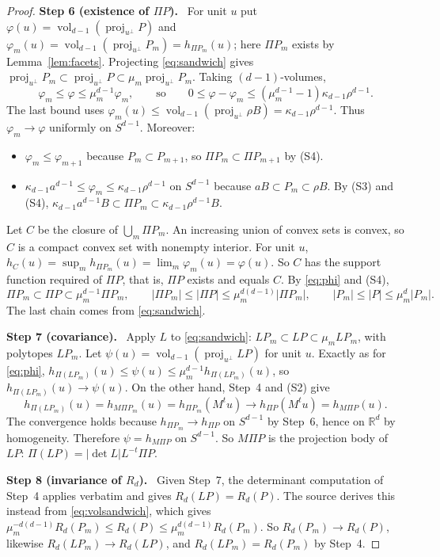 \documentclass[11pt]{article}
\newcommand{\R}{\mathbb R}
\DeclareMathOperator{\vol}{vol}
\DeclareMathOperator{\proj}{proj}
\newcommand{\step}[1]{\par\smallskip\noindent\textbf{#1}\ }
\begin{document}
\begin{proof}
\step{Step 6 (existence of \(\Pi P\)).} For unit \(u\) put
\(\varphi(u)=\vol_{d-1}(\proj_{u^\perp}P)\) and
\(\varphi_m(u)=\vol_{d-1}(\proj_{u^\perp}P_m)=h_{\Pi P_m}(u)\); here
\(\Pi P_m\) exists by Lemma~\ref{lem:facets}. Projecting
\eqref{eq:sandwich} gives
\(\proj_{u^\perp}P_m\subset\proj_{u^\perp}P\subset
\mu_m\proj_{u^\perp}P_m\). Taking \((d-1)\)-volumes,
\begin{equation}\label{eq:phi}
 \varphi_m\le\varphi\le\mu_m^{d-1}\varphi_m,
 \qquad\text{so}\qquad
 0\le\varphi-\varphi_m
 \le(\mu_m^{d-1}-1)\kappa_{d-1}\rho^{d-1}.
\end{equation}
The last bound uses
\(\varphi_m(u)\le\vol_{d-1}(\proj_{u^\perp}\rho B)=\kappa_{d-1}\rho^{d-1}\).
Thus \(\varphi_m\to\varphi\) uniformly on \(S^{d-1}\). Moreover:
\begin{itemize}[leftmargin=2em,itemsep=2pt]
\item \(\varphi_m\le\varphi_{m+1}\) because \(P_m\subset P_{m+1}\), so
 \(\Pi P_m\subset\Pi P_{m+1}\) by (S4).
\item \(\kappa_{d-1}a^{d-1}\le\varphi_m\le\kappa_{d-1}\rho^{d-1}\) on
 \(S^{d-1}\) because \(aB\subset P_m\subset\rho B\). By (S3) and (S4),
 \(\kappa_{d-1}a^{d-1}B\subset\Pi P_m\subset\kappa_{d-1}\rho^{d-1}B\).
\end{itemize}
Let \(C\) be the closure of \(\bigcup_m\Pi P_m\). An increasing union of
convex sets is convex, so \(C\) is a compact convex set with nonempty
interior. For unit \(u\),
\(h_C(u)=\sup_mh_{\Pi P_m}(u)=\lim_m\varphi_m(u)=\varphi(u)\). So \(C\)
has the support function required of \(\Pi P\), that is, \(\Pi P\) exists
and equals \(C\). By \eqref{eq:phi} and (S4),
\begin{equation}\label{eq:volsandwich}
 \Pi P_m\subset\Pi P\subset\mu_m^{d-1}\Pi P_m,
 \qquad
 |\Pi P_m|\le|\Pi P|\le\mu_m^{d(d-1)}|\Pi P_m|,
 \qquad
 |P_m|\le|P|\le\mu_m^d|P_m|.
\end{equation}
The last chain comes from \eqref{eq:sandwich}.

\step{Step 7 (covariance).} Apply \(L\) to \eqref{eq:sandwich}:
\(LP_m\subset LP\subset\mu_mLP_m\), with polytopes \(LP_m\). Let
\(\psi(u)=\vol_{d-1}(\proj_{u^\perp}LP)\) for unit \(u\). Exactly as for
\eqref{eq:phi},
\(h_{\Pi(LP_m)}(u)\le\psi(u)\le\mu_m^{d-1}h_{\Pi(LP_m)}(u)\), so
\(h_{\Pi(LP_m)}(u)\to\psi(u)\). On the other hand, Step~4 and (S2) give
\[
 h_{\Pi(LP_m)}(u)=h_{M\Pi P_m}(u)=h_{\Pi P_m}(M^tu)
 \longrightarrow h_{\Pi P}(M^tu)=h_{M\Pi P}(u).
\]
The convergence holds because \(h_{\Pi P_m}\to h_{\Pi P}\) on \(S^{d-1}\)
by Step~6, hence on \(\R^d\) by homogeneity. Therefore
\(\psi=h_{M\Pi P}\) on \(S^{d-1}\). So \(M\Pi P\) is the projection body
of \(LP\): \(\Pi(LP)=|\det L|L^{-t}\Pi P\).

\step{Step 8 (invariance of \(R_d\)).} Given Step~7, the determinant
computation of Step~4 applies verbatim and gives \(R_d(LP)=R_d(P)\). The
source derives this instead from \eqref{eq:volsandwich}, which gives
\(\mu_m^{-d(d-1)}R_d(P_m)\le R_d(P)\le\mu_m^{d(d-1)}R_d(P_m)\). So
\(R_d(P_m)\to R_d(P)\), likewise \(R_d(LP_m)\to R_d(LP)\), and
\(R_d(LP_m)=R_d(P_m)\) by Step~4.
\end{proof}
\end{document}
